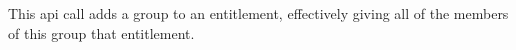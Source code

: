 This api call adds a group to an entitlement, effectively giving all of the members of this
group that entitlement.
